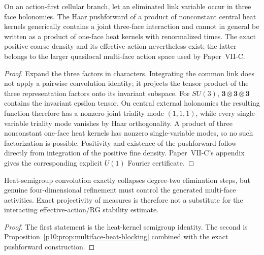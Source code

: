 \documentclass[12pt,a4paper]{article}
\begin{document}
\begin{proposition}
\label{p10:prop:multiface-heat-blocking}
On an action-first cellular branch, let an eliminated link variable occur in
three face holonomies.  The Haar pushforward of a product of nonconstant
central heat kernels generically contains a joint three-face interaction and
cannot in general be written as a product of one-face heat kernels with
renormalized times.  The exact positive coarse density and its effective
action nevertheless exist; the latter belongs to the larger quasilocal
multi-face action space used by Paper~VII-C.
\end{proposition}
\begin{proof}
Expand the three factors in characters.  Integrating the common link does not
apply a pairwise convolution identity; it projects the tensor product of the
three representation factors onto its invariant subspace.  For $SU(3)$,
$\mathbf3\otimes\mathbf3\otimes\mathbf3$ contains the invariant epsilon
tensor.  On central external holonomies the resulting function therefore has
a nonzero joint triality mode $(1,1,1)$, while every single-variable triality
mode vanishes by Haar orthogonality.  A product of three nonconstant one-face
heat kernels has nonzero single-variable modes, so no such factorization is
possible.  Positivity and existence of the pushforward follow directly from
integration of the positive fine density.  Paper~VII-C's appendix gives the
corresponding explicit $U(1)$ Fourier certificate.
\end{proof}

\begin{corollary}
\label{p10:cor:multiface-effective-action-target}
Heat-semigroup convolution exactly collapses degree-two elimination steps,
but genuine four-dimensional refinement must control the generated
multi-face activities.  Exact projectivity of measures is therefore not a
substitute for the interacting effective-action/RG stability estimate.
\end{corollary}
\begin{proof}
The first statement is the heat-kernel semigroup identity.  The second is
Proposition~\ref{p10:prop:multiface-heat-blocking} combined with the exact
pushforward construction.
\end{proof}
\end{document}
